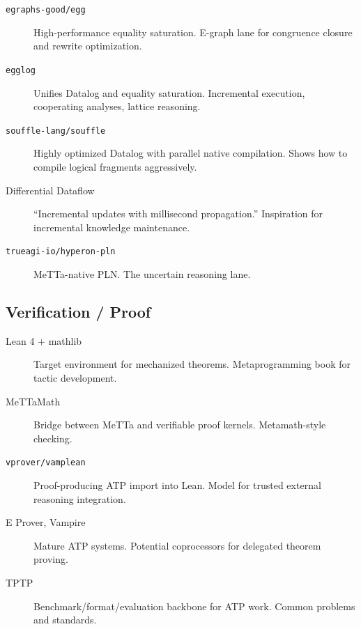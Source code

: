\documentclass[11pt]{article}
\newcommand{\code}[1]{\texttt{#1}}
\begin{document}
\begin{description}
\item[\code{egraphs-good/egg}]
  High-performance equality saturation.  E-graph lane for congruence
  closure and rewrite optimization.

\item[\code{egglog}]
  Unifies Datalog and equality saturation.  Incremental execution,
  cooperating analyses, lattice reasoning.

\item[\code{souffle-lang/souffle}]
  Highly optimized Datalog with parallel native compilation.  Shows
  how to compile logical fragments aggressively.

\item[Differential Dataflow]
  ``Incremental updates with millisecond propagation.''  Inspiration
  for incremental knowledge maintenance.

\item[\code{trueagi-io/hyperon-pln}]
  MeTTa-native PLN.  The uncertain reasoning lane.
\end{description}

\subsection{Verification / Proof}

\begin{description}
\item[Lean 4 + mathlib]
  Target environment for mechanized theorems.  Metaprogramming book
  for tactic development.

\item[MeTTaMath]
  Bridge between MeTTa and verifiable proof kernels.  Metamath-style
  checking.

\item[\code{vprover/vamplean}]
  Proof-producing ATP import into Lean.  Model for trusted external
  reasoning integration.

\item[E Prover, Vampire]
  Mature ATP systems.  Potential coprocessors for delegated theorem
  proving.

\item[TPTP]
  Benchmark/format/evaluation backbone for ATP work.  Common problems
  and standards.
\end{description}

\end{document}
